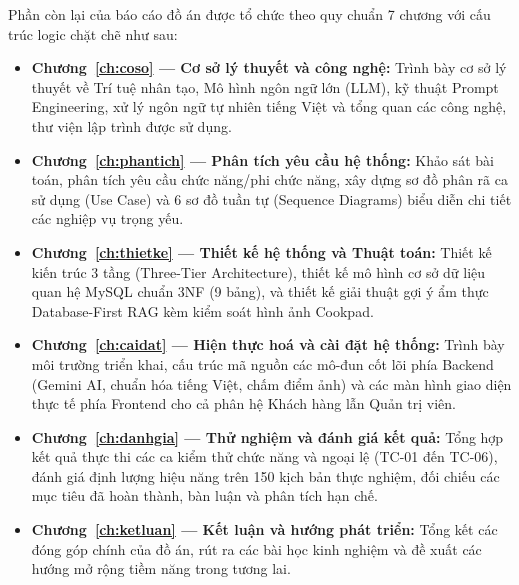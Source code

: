 Phần còn lại của báo cáo đồ án được tổ chức theo quy chuẩn 7 chương với cấu trúc logic chặt chẽ như sau:
\begin{itemize}[leftmargin=1.6em, itemsep=3pt]
  \item \textbf{Chương~\ref{ch:coso} --- Cơ sở lý thuyết và công nghệ:} Trình bày cơ sở lý thuyết về Trí tuệ nhân tạo, Mô hình ngôn ngữ lớn (LLM), kỹ thuật Prompt Engineering, xử lý ngôn ngữ tự nhiên tiếng Việt và tổng quan các công nghệ, thư viện lập trình được sử dụng.
  \item \textbf{Chương~\ref{ch:phantich} --- Phân tích yêu cầu hệ thống:} Khảo sát bài toán, phân tích yêu cầu chức năng/phi chức năng, xây dựng sơ đồ phân rã ca sử dụng (Use Case) và 6 sơ đồ tuần tự (Sequence Diagrams) biểu diễn chi tiết các nghiệp vụ trọng yếu.
  \item \textbf{Chương~\ref{ch:thietke} --- Thiết kế hệ thống và Thuật toán:} Thiết kế kiến trúc 3 tầng (Three-Tier Architecture), thiết kế mô hình cơ sở dữ liệu quan hệ MySQL chuẩn 3NF (9 bảng), và thiết kế giải thuật gợi ý ẩm thực Database-First RAG kèm kiểm soát hình ảnh Cookpad.
  \item \textbf{Chương~\ref{ch:caidat} --- Hiện thực hoá và cài đặt hệ thống:} Trình bày môi trường triển khai, cấu trúc mã nguồn các mô-đun cốt lõi phía Backend (Gemini AI, chuẩn hóa tiếng Việt, chấm điểm ảnh) và các màn hình giao diện thực tế phía Frontend cho cả phân hệ Khách hàng lẫn Quản trị viên.
  \item \textbf{Chương~\ref{ch:danhgia} --- Thử nghiệm và đánh giá kết quả:} Tổng hợp kết quả thực thi các ca kiểm thử chức năng và ngoại lệ (TC-01 đến TC-06), đánh giá định lượng hiệu năng trên 150 kịch bản thực nghiệm, đối chiếu các mục tiêu đã hoàn thành, bàn luận và phân tích hạn chế.
  \item \textbf{Chương~\ref{ch:ketluan} --- Kết luận và hướng phát triển:} Tổng kết các đóng góp chính của đồ án, rút ra các bài học kinh nghiệm và đề xuất các hướng mở rộng tiềm năng trong tương lai.
\end{itemize}
